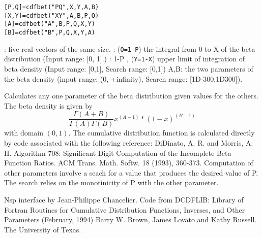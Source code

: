 \begin{mandesc}
\end{mandesc}
\label{cdfbet}
\begin{calling_sequence}
\begin{verbatim}
[P,Q]=cdfbet("PQ",X,Y,A,B)  
[X,Y]=cdfbet("XY",A,B,P,Q)  
[A]=cdfbet("A",B,P,Q,X,Y)  
[B]=cdfbet("B",P,Q,X,Y,A)  
\end{verbatim}
\end{calling_sequence}
\begin{parameters}
  \begin{varlist}
    : five real vectors of the same size.
    : (\verb+Q=1-P+) the integral from 0 to X of the beta distribution (Input range: [0, 1].)
    : 1-P
    , (\verb+Y=1-X+) upper limit of integration of beta density (Input range: [0,1],  Search range: [0,1]) A,B: the two parameters of the beta density (input range: (0, +infinity), Search range: [1D-300,1D300]).
  \end{varlist}
\end{parameters}
\begin{mandescription}
  Calculates any one parameter of the beta distribution given
  values for the others. The beta density is given by
  \begin{equation}
    \frac{\Gamma(A+B)}{\Gamma(A)\Gamma(B)} x^{(A-1)} * (1-x)^{(B-1)}
  \end{equation}
  with domain $(0,1)$.
  The cumulative distribution function is calculated directly by
  code associated with the following reference: 
  DiDinato, A. R. and Morris,  A.   H.  Algorithm 708: Significant
  Digit Computation of the Incomplete  Beta  Function Ratios.  ACM
  Trans. Math.  Softw. 18 (1993), 360-373.
  Computation of other parameters involve a seach for a value that
  produces  the desired  value  of P.   The search relies  on  the
  monotinicity of P with the other parameter.
\end{mandescription}

\begin{program}
\end{program}

\begin{authors}
  Nsp interface by Jean-Philippe Chancelier. Code from DCDFLIB: 
  Library of Fortran Routines for Cumulative Distribution
  Functions, Inverses, and Other Parameters (February, 1994)
  Barry W. Brown, James Lovato and Kathy Russell. The University of Texas.
\end{authors}

